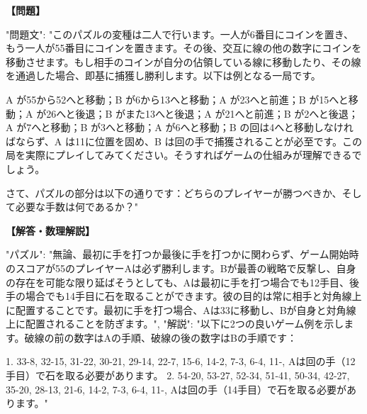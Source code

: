 \documentclass[10pt,a4paper,oneside,openany]{ltjsbook}
\begin{document}
\begin{tcolorbox}[colback=softblue,colframe=primaryblue,title=\textbf{第 394 問：PUSS IN THE CORNER.},arc=2mm,boxrule=1pt,breakable]
\textbf{【問題】}\par\vspace{0.3em}
{
  "問題文": "このパズルの変種は二人で行います。一人が6番目にコインを置き、もう一人が55番目にコインを置きます。その後、交互に線の他の数字にコインを移動させます。もし相手のコインが自分の佔領している線に移動したり、その線を通過した場合、即基に捕獲し勝利します。以下は例となる一局です。

A が55から52へと移動；B が6から13へと移動；A が23へと前進；B が15へと移動；A が26へと後退；B がまた13へと後退；A が21へと前進；B が2へと後退；A が7へと移動；B が3へと移動；A が6へと移動；B の回は4へと移動しなければならず、A は11に位置を固め、B は回の手で捕獲されることが必至です。この局を実際にプレイしてみてください。そうすればゲームの仕組みが理解できるでしょう。

さて、パズルの部分は以下の通りです：どちらのプレイヤーが勝つべきか、そして必要な手数は何であるか？"
}
\tcblower
\textbf{【解答・数理解説】}\par\vspace{0.3em}
{
"パズル": "無論、最初に手を打つか最後に手を打つかに関わらず、ゲーム開始時のスコアが55のプレイヤーAは必ず勝利します。Bが最善の戦略で反撃し、自身の存在を可能な限り延ばそうとしても、Aは最初に手を打つ場合でも12手目、後手の場合でも14手目に石を取ることができます。彼の目的は常に相手と対角線上に配置することです。最初に手を打つ場合、Aは33に移動し、Bが自身と対角線上に配置されることを防ぎます。",
"解説": "以下に2つの良いゲーム例を示します。破線の前の数字はAの手順、破線の後の数字はBの手順です：

1. 33-8, 32-15, 31-22, 30-21, 29-14, 22-7, 15-6, 14-2, 7-3, 6-4, 11-, Aは回の手（12手目）で石を取る必要があります。
2. 54-20, 53-27, 52-34, 51-41, 50-34, 42-27, 35-20, 28-13, 21-6, 14-2, 7-3, 6-4, 11-, Aは回の手（14手目）で石を取る必要があります。"
}
\end{tcolorbox}
\end{document}

